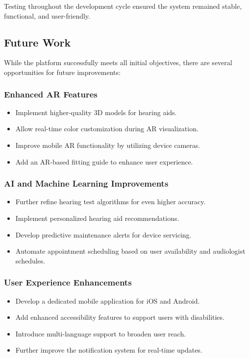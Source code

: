 \documentclass{article}
\begin{document}
Testing throughout the development cycle ensured the system remained stable, functional, and user-friendly.

\subsection{Future Work}
While the platform successfully meets all initial objectives, there are several opportunities for future improvements:

\subsubsection{Enhanced AR Features}
\begin{itemize}
    \item Implement higher-quality 3D models for hearing aids.
    \item Allow real-time color customization during AR visualization.
    \item Improve mobile AR functionality by utilizing device cameras.
    \item Add an AR-based fitting guide to enhance user experience.
\end{itemize}

\subsubsection{AI and Machine Learning Improvements}
\begin{itemize}
    \item Further refine hearing test algorithms for even higher accuracy.
    \item Implement personalized hearing aid recommendations.
    \item Develop predictive maintenance alerts for device servicing.
    \item Automate appointment scheduling based on user availability and audiologist schedules.
\end{itemize}

\subsubsection{User Experience Enhancements}
\begin{itemize}
    \item Develop a dedicated mobile application for iOS and Android.
    \item Add enhanced accessibility features to support users with disabilities.
    \item Introduce multi-language support to broaden user reach.
    \item Further improve the notification system for real-time updates.
\end{itemize}
\end{document}
